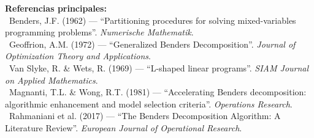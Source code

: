 \documentclass[10pt,a4paper]{article}
\numberwithin{equation}{section}
\begin{document}
\vspace{12pt}
\begin{tcolorbox}[colback=sectionbg!8, colframe=sectionbg!40, boxrule=0.5pt, arc=3pt,
    left=8pt, right=8pt, top=6pt, bottom=6pt]
  {\small\sffamily\bfseries Referencias principales:}\\[3pt]
  {\footnotesize
    \textbullet\ Benders, J.F. (1962) — ``Partitioning procedures for solving mixed-variables programming problems''. \textit{Numerische Mathematik}.\\
    \textbullet\ Geoffrion, A.M. (1972) — ``Generalized Benders Decomposition''. \textit{Journal of Optimization Theory and Applications}.\\
    \textbullet\ Van Slyke, R. \& Wets, R. (1969) — ``L-shaped linear programs''. \textit{SIAM Journal on Applied Mathematics}.\\
    \textbullet\ Magnanti, T.L. \& Wong, R.T. (1981) — ``Accelerating Benders decomposition: algorithmic enhancement and model selection criteria''. \textit{Operations Research}.\\
    \textbullet\ Rahmaniani et al. (2017) — ``The Benders Decomposition Algorithm: A Literature Review''. \textit{European Journal of Operational Research}.
  }
\end{tcolorbox}
\end{document}
